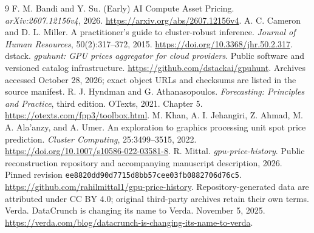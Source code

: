 \documentclass[10pt]{article}
\begin{document}
\clearpage
\begin{thebibliography}{9}
F. M. Bandi and Y. Su. (Early) AI Compute Asset Pricing. \emph{arXiv:2607.12156v4}, 2026. \url{https://arxiv.org/abs/2607.12156v4}.
A. C. Cameron and D. L. Miller. A practitioner's guide to cluster-robust inference. \emph{Journal of Human Resources}, 50(2):317--372, 2015. \url{https://doi.org/10.3368/jhr.50.2.317}.
dstack. \emph{gpuhunt: GPU prices aggregator for cloud providers}. Public software and versioned catalog infrastructure. \url{https://github.com/dstackai/gpuhunt}. Archives accessed October 28, 2026; exact object URLs and checksums are listed in the source manifest.
R. J. Hyndman and G. Athanasopoulos. \emph{Forecasting: Principles and Practice}, third edition. OTexts, 2021. Chapter 5. \url{https://otexts.com/fpp3/toolbox.html}.
M. Khan, A. I. Jehangiri, Z. Ahmad, M. A. Ala'anzy, and A. Umer. An exploration to graphics processing unit spot price prediction. \emph{Cluster Computing}, 25:3499--3515, 2022. \url{https://doi.org/10.1007/s10586-022-03581-8}.
R. Mittal. \emph{gpu-price-history}. Public reconstruction repository and accompanying manuscript description, 2026. Pinned revision \texttt{ee8820dd90d7715d8bb57cee03fb0882706d76c5}. \url{https://github.com/rahilmittal1/gpu-price-history}. Repository-generated data are attributed under CC BY 4.0; original third-party archives retain their own terms.
Verda. DataCrunch is changing its name to Verda. November 5, 2025. \url{https://verda.com/blog/datacrunch-is-changing-its-name-to-verda}.
\end{thebibliography}
\end{document}
